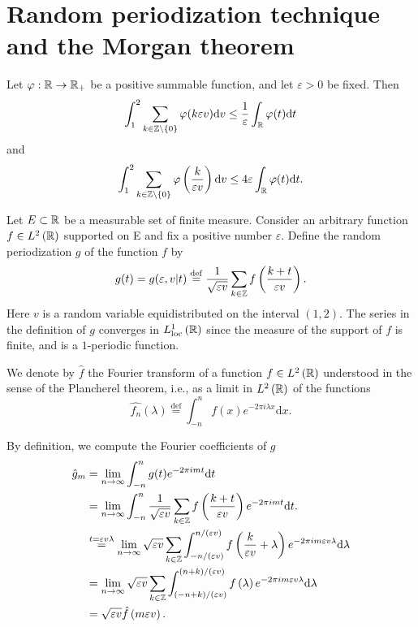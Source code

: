 \section{Random periodization technique and the Morgan theorem}
\begin{lemma}
  Let $\varphi:\mathbb{R}\to \mathbb{R}_{+}$ be a positive summable function, and let $\varepsilon >0$ be fixed. Then 
  \[
    \int_1^{2}\sum_{k\in \mathbb{Z}\backslash \{0\} }^{} \varphi(k\varepsilon v)\mathrm{d}v\le  \frac{1}{\varepsilon }\int_{\mathbb{R}}\varphi(t)\mathrm{d}t
  \] 
  and \[
    \int_1^{2}\sum_{k\in \mathbb{Z}\backslash \{0\} }^{} \varphi\left( \frac{k}{\varepsilon v} \right) \mathrm{d}v\le 4\varepsilon \int_{\mathbb{R}}\varphi(t)\mathrm{d}t.
  \] 
\end{lemma}
\begin{definition}
Let $E\subset \mathbb{R}$ be a measurable set of finite measure. Consider an arbitrary function $f\in L^{2}\left( \mathbb{R} \right) $ supported on E and fix a positive number $\varepsilon $. Define the random periodization $g$ of the function $f$ by
\[
  g(t)=g(\varepsilon ,v\lvert t)\overset{\mathrm{def}}{=} \frac{1}{\sqrt{\varepsilon v} }\sum_{k\in \mathbb{Z}}^{} f\left( \frac{k+t}{\varepsilon v} \right) .
\] 
Here $v$ is a random variable equidistributed on the interval $(1,2)$. The series in the definition of $g$ converges in $L^1_{\mathrm{loc}}\left( \mathbb{R} \right) $ since the measure of the support of $f$ is finite, and is a $1$-periodic function. 
\end{definition}
\begin{definition}
  We denote by $\hat{f}$ the Fourier transform of a function $f\in L^2\left( \mathbb{R} \right) $ understood in the sense of the Plancherel theorem, i.e., as a limit in $L^2\left( \mathbb{R} \right) $ of the functions
  \[
    \hat{f_n}(\lambda)\overset{\mathrm{def}}{=}\int_{-n}^{n}f(x)e^{-2\pi i \lambda x}\mathrm{d}x.
  \] 
\end{definition}
By definition, we compute the Fourier coefficients of $g$
\begin{equation*}
  \begin{aligned}
    \hat{g}_m & =  \lim_{n\to \infty}\int_{-n}^{n}g(t)e^{-2\pi i m t }\mathrm{d}t\\
    & = \lim_{n \to \infty} \int_{-n}^{n}\frac{1}{\sqrt{\varepsilon v} }\sum_{k\in \mathbb{Z}}^{} f\left( \frac{k+t}{\varepsilon  v} \right) e^{-2\pi i m t}\mathrm{d}t.\\
    & \overset{t=\varepsilon v\lambda}{=} \lim_{n\to \infty}\sqrt{\varepsilon  v} \sum_{k\in \mathbb{Z}}^{} \int_{-n / (\varepsilon v)}^{n / (\varepsilon v)} f\left( \frac{k}{\varepsilon v}+\lambda \right) e^{-2\pi i m \varepsilon v\lambda}\mathrm{d}\lambda\\
    & = \lim_{n \to \infty} \sqrt{\varepsilon v} \sum_{k\in \mathbb{Z}}^{} \int_{(-n+k) / (\varepsilon v)}^{(n+k) / (\varepsilon  v)} f\left( \lambda \right) e^{-2\pi i m\varepsilon  v\lambda}\mathrm{d}\lambda\\
    & = \sqrt{\varepsilon v} \hat{f}\left( m\varepsilon v \right) .
  \end{aligned}
\end{equation*}
